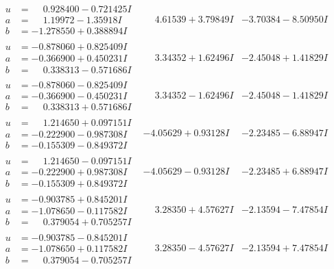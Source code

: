 \documentclass[1p]{elsarticle_modified}
\theoremstyle{definition}
\begin{document}
$$\begin{array}{c|c|c}
\begin{aligned}
u &= \phantom{-}0.928400 - 0.721425 I \\
a &= \phantom{-}1.19972 - 1.35918 I \\
b &= -1.278550 + 0.388894 I\end{aligned}
 & \phantom{-}4.61539 + 3.79849 I & -3.70384 - 8.50950 I \\ \hline\begin{aligned}
u &= -0.878060 + 0.825409 I \\
a &= -0.366900 + 0.450231 I \\
b &= \phantom{-}0.338313 - 0.571686 I\end{aligned}
 & \phantom{-}3.34352 + 1.62496 I & -2.45048 + 1.41829 I \\ \hline\begin{aligned}
u &= -0.878060 - 0.825409 I \\
a &= -0.366900 - 0.450231 I \\
b &= \phantom{-}0.338313 + 0.571686 I\end{aligned}
 & \phantom{-}3.34352 - 1.62496 I & -2.45048 - 1.41829 I \\ \hline\begin{aligned}
u &= \phantom{-}1.214650 + 0.097151 I \\
a &= -0.222900 - 0.987308 I \\
b &= -0.155309 - 0.849372 I\end{aligned}
 & -4.05629 + 0.93128 I & -2.23485 - 6.88947 I \\ \hline\begin{aligned}
u &= \phantom{-}1.214650 - 0.097151 I \\
a &= -0.222900 + 0.987308 I \\
b &= -0.155309 + 0.849372 I\end{aligned}
 & -4.05629 - 0.93128 I & -2.23485 + 6.88947 I \\ \hline\begin{aligned}
u &= -0.903785 + 0.845201 I \\
a &= -1.078650 - 0.117582 I \\
b &= \phantom{-}0.379054 + 0.705257 I\end{aligned}
 & \phantom{-}3.28350 + 4.57627 I & -2.13594 - 7.47854 I \\ \hline\begin{aligned}
u &= -0.903785 - 0.845201 I \\
a &= -1.078650 + 0.117582 I \\
b &= \phantom{-}0.379054 - 0.705257 I\end{aligned}
 & \phantom{-}3.28350 - 4.57627 I & -2.13594 + 7.47854 I \\ \hline\begin{aligned}

\end{aligned}
\end{array}$$
\end{document}

